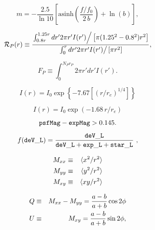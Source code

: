 \documentclass[preprint,graphicx]{aastex}
\begin{document}
{\newpage\clearpage\samepage
\begin{equation}\label{luptitude}
m = -\frac{2.5}{\ln 10} \left[{\mathrm{asinh}}\left(\frac{f/f_0}{2\,b}\right) 
+ \ln(b)\right],
\end{equation}}\hbox{}\vfil

{\newpage\clearpage\samepage
\begin{equation}\label{petroratio}
{{\mathcal{R}}_P} (r)\equiv \frac{\left.
\int_{0.8 r}^{1.25 r} dr' 2\pi r'
I(r') \right/ \left[\pi(1.25^2 -
0.8^2) r^2\right]}{\left.
\int_0^r dr' 2\pi r'
I(r') \right/ [\pi r^2]},
\end{equation}}\hbox{}\vfil

{\newpage\clearpage\samepage
\begin{equation}F_P \equiv \int_0^{{{N}_P} {{r}_P}} 2\pi r'dr' I(r').
\end{equation}}\hbox{}\vfil

{\newpage\clearpage\samepage
\begin{equation}I(r) = I_0 \exp\left\{-7.67[(r/r_e)^{1/4}]\right\}
\end{equation}}\hbox{}\vfil

{\newpage\clearpage\samepage
\begin{equation}I(r) = I_0 \exp(-1.68\,r/r_e)
\end{equation}}\hbox{}\vfil

{\newpage\clearpage\samepage
\begin{equation}\mathrm{{\tt psfMag}} - \mathrm{{\tt expMag}} > 0.145.
\end{equation}}\hbox{}\vfil

{\newpage\clearpage\samepage
\begin{equation}f({\tt deV\_L})   =  \frac{{\tt deV\_L}}{{\tt deV\_L} + {\tt exp\_L}
+ {\tt star\_L}}\ ,
\end{equation}}\hbox{}\vfil

{\newpage\clearpage\samepage
\begin{eqnarray}M_{xx} &\equiv& {\langle{x^2/r^2}\rangle} \cr
M_{yy} &\equiv& {\langle{y^2/r^2}\rangle} \cr
M_{xy} &\equiv& {\langle{xy/r^2}\rangle} 
\end{eqnarray}}\hbox{}\vfil

{\newpage\clearpage\samepage
\begin{eqnarray}Q &\equiv& M_{xx} - M_{yy} = \frac{a-b}{a+b} \cos 2\phi\cr
U &\equiv& M_{xy} = \frac{a-b}{a+b} \sin 2\phi,
\end{eqnarray}}\hbox{}\vfil
\end{document}
